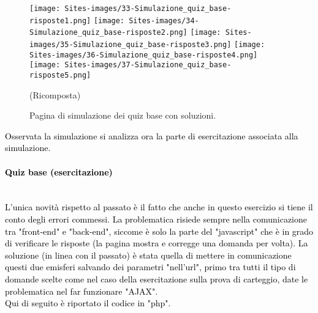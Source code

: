 \begin{minipage}{\textwidth}
\begin{figure}[H]
	\begin{center}
		\texttt{[image: Sites-images/33-Simulazione\_quiz\_base-risposte1.png]}
		\texttt{[image: Sites-images/34-Simulazione\_quiz\_base-risposte2.png]}
		\texttt{[image: Sites-images/35-Simulazione\_quiz\_base-risposte3.png]}
		\texttt{[image: Sites-images/36-Simulazione\_quiz\_base-risposte4.png]}
		\texttt{[image: Sites-images/37-Simulazione\_quiz\_base-risposte5.png]}
		\caption{Pagina di simulazione dei quiz base con soluzioni.}
		(Ricomposta)
	\end{center}
\end{figure}
\end{minipage}

\textcolor{black}{Osservata la simulazione si analizza ora la parte di esercitazione associata alla simulazione.}\\

\paragraph{\textcolor{black}{Quiz base (esercitazione)}}\leavevmode\\
\textcolor{black}{L'unica novità rispetto al passato è il fatto che anche in questo esercizio si tiene il conto degli errori commessi. La problematica risiede sempre nella comunicazione tra "front-end" e "back-end", siccome è solo la parte del "javascript" che è in grado di verificare le risposte (la pagina mostra e corregge una domanda per volta). La soluzione (in linea con il passato) è stata quella di mettere in comunicazione questi due emisferi salvando dei parametri "nell'url", primo tra tutti il tipo di domande scelte come nel caso della esercitazione sulla prova di carteggio, date le problematica nel far funzionare "AJAX".\\
Qui di seguito è riportato il codice in "php".}\\

